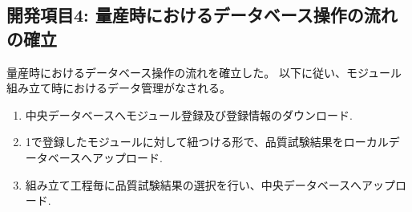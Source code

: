 \subsection{開発項目4: 量産時におけるデータベース操作の流れの確立}\label{sec:design_QC_flow}
量産時におけるデータベース操作の流れを確立した。
以下に従い、モジュール組み立て時におけるデータ管理がなされる。
\begin{enumerate}
  \item 中央データベースへモジュール登録及び登録情報のダウンロード.
  \item 1で登録したモジュールに対して紐つける形で、品質試験結果をローカルデータベースへアップロード.
  \item 組み立て工程毎に品質試験結果の選択を行い、中央データベースへアップロード.
\end{enumerate}

